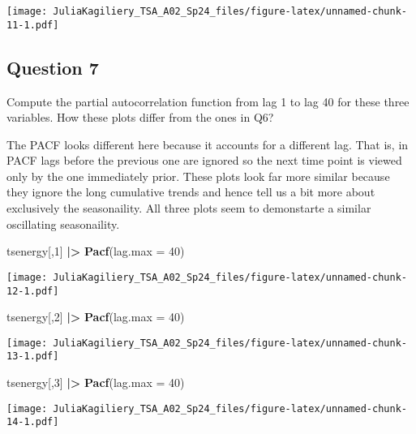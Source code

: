 \documentclass[
]{article}
\newenvironment{Shaded}{\begin{snugshade}}{\end{snugshade}}
\newcommand{\AttributeTok}[1]{\textcolor[rgb]{0.13,0.29,0.53}{#1}}
\newcommand{\DecValTok}[1]{\textcolor[rgb]{0.00,0.00,0.81}{#1}}
\newcommand{\FunctionTok}[1]{\textcolor[rgb]{0.13,0.29,0.53}{\textbf{#1}}}
\newcommand{\NormalTok}[1]{#1}
\newcommand{\SpecialCharTok}[1]{\textcolor[rgb]{0.81,0.36,0.00}{\textbf{#1}}}
\begin{document}
\texttt{[image: JuliaKagiliery\_TSA\_A02\_Sp24\_files/figure-latex/unnamed-chunk-11-1.pdf]}

\hypertarget{question-7}{%
\subsection{Question 7}\label{question-7}}

Compute the partial autocorrelation function from lag 1 to lag 40 for
these three variables. How these plots differ from the ones in Q6?

The PACF looks different here because it accounts for a different lag.
That is, in PACF lags before the previous one are ignored so the next
time point is viewed only by the one immediately prior. These plots look
far more similar because they ignore the long cumulative trends and
hence tell us a bit more about exclusively the seasonaility. All three
plots seem to demonstarte a similar oscillating seasonaility.

\begin{Shaded}
\begin{Highlighting}[]
\NormalTok{tsenergy[,}\DecValTok{1}\NormalTok{] }\SpecialCharTok{|\textgreater{}}
  \FunctionTok{Pacf}\NormalTok{(}\AttributeTok{lag.max =} \DecValTok{40}\NormalTok{)}
\end{Highlighting}
\end{Shaded}

\texttt{[image: JuliaKagiliery\_TSA\_A02\_Sp24\_files/figure-latex/unnamed-chunk-12-1.pdf]}

\begin{Shaded}
\begin{Highlighting}[]
\NormalTok{tsenergy[,}\DecValTok{2}\NormalTok{] }\SpecialCharTok{|\textgreater{}}
  \FunctionTok{Pacf}\NormalTok{(}\AttributeTok{lag.max =} \DecValTok{40}\NormalTok{)}
\end{Highlighting}
\end{Shaded}

\texttt{[image: JuliaKagiliery\_TSA\_A02\_Sp24\_files/figure-latex/unnamed-chunk-13-1.pdf]}

\begin{Shaded}
\begin{Highlighting}[]
\NormalTok{tsenergy[,}\DecValTok{3}\NormalTok{] }\SpecialCharTok{|\textgreater{}}
  \FunctionTok{Pacf}\NormalTok{(}\AttributeTok{lag.max =} \DecValTok{40}\NormalTok{)}
\end{Highlighting}
\end{Shaded}

\texttt{[image: JuliaKagiliery\_TSA\_A02\_Sp24\_files/figure-latex/unnamed-chunk-14-1.pdf]}
\end{document}
